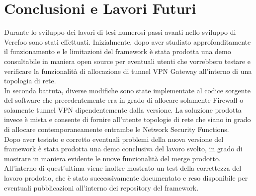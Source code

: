 \chapter{Conclusioni e Lavori Futuri} \label{ch:conclusions}

Durante lo sviluppo dei lavori di tesi numerosi passi avanti nello sviluppo di Verefoo sono stati effettuati.
Inizialmente, dopo aver studiato approfonditamente il funzionamento e le limitazioni del framework è stata prodotta
una demo consultabile in maniera open source per eventuali utenti che vorrebbero testare e verificare la funzionalità di 
allocazione di tunnel VPN Gateway all'interno di una topologia di rete.
\\

In seconda battuta, diverse modifiche sono state implementate al codice sorgente del software che precedentemente era in grado
di allocare solamente Firewall o solamente tunnel VPN dipendentemente dalla versione. La soluzione prodotta invece è mista e consente
di fornire all'utente topologie di rete che siano in grado di allocare contemporaneamente entrambe le Network Security Functions.
\\ 

Dopo aver testato e corretto eventuali problemi della nuova versione del framework è stata prodotta una demo conclusiva del lavoro svolto,
in grado di mostrare in maniera evidente le nuove funzionalità del merge prodotto. All'interno di quest'ultima viene inoltre mostrato un test
della correttezza del lavoro prodotto, che è stato successivamente documentato e reso disponibile per eventuali pubblicazioni all'interno dei repository
del framework.
\\

